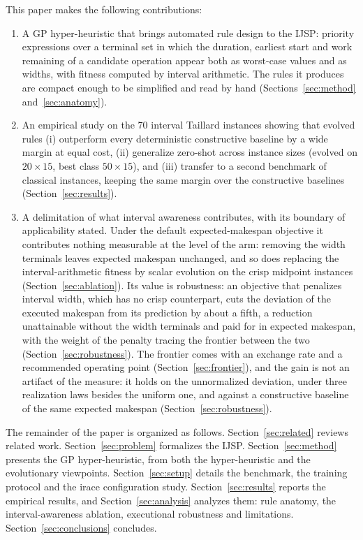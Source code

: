 \documentclass[review,authoryear,11pt]{elsarticle}
\newcommand{\rev}[1]{\textcolor{revcolor}{#1}}
\begin{document}
This paper makes the following contributions:
\begin{enumerate}
\item A GP hyper-heuristic that brings automated rule design to the
  IJSP: priority expressions over a terminal set in which the duration,
  earliest start and work remaining of a candidate operation appear
  both as worst-case values and as widths, with fitness computed by
  interval arithmetic. The rules it produces are compact enough to be
  simplified and read by hand (Sections~\ref{sec:method}
  and~\ref{sec:anatomy}).
\item An empirical study on the 70 interval Taillard instances showing
  that evolved rules (i) outperform every deterministic constructive
  baseline by a wide margin at equal cost, (ii) generalize zero-shot across instance
  sizes (evolved on $20{\times}15$, best class $50{\times}15$), and
  (iii) transfer to a second benchmark of classical instances, keeping
  the same margin over the constructive baselines
  (Section~\ref{sec:results}).
\item A delimitation of what interval awareness contributes, \rev{with
  its boundary of applicability stated}. \rev{Under the default
  expected-makespan objective it contributes nothing measurable at the
  level of the arm}: removing the width terminals leaves expected
  makespan unchanged, and so does replacing the interval-arithmetic
  fitness by scalar evolution on the crisp midpoint instances
  (Section~\ref{sec:ablation}). Its value is robustness: an
  objective that penalizes interval width, which has no crisp
  counterpart, cuts the deviation of the executed makespan from its
  prediction by about a fifth, a reduction unattainable without the
  width terminals and paid for in expected makespan, with the weight of
  the penalty tracing the frontier between the two
  (Section~\ref{sec:robustness}). \rev{The frontier comes with an
  exchange rate and a recommended operating point
  (Section~\ref{sec:frontier}), and the gain is not an artifact of the
  measure: it holds on the unnormalized deviation, under three
  realization laws besides the uniform one, and against a constructive
  baseline of the same expected makespan
  (Section~\ref{sec:robustness}).}
\end{enumerate}

The remainder of the paper is organized as follows.
Section~\ref{sec:related} reviews related work.
Section~\ref{sec:problem} formalizes the IJSP.
Section~\ref{sec:method} presents the GP hyper-heuristic, from both the
hyper-heuristic and the evolutionary viewpoints.
Section~\ref{sec:setup} details the benchmark, the training protocol and
the irace configuration study. Section~\ref{sec:results} reports the
empirical results, and Section~\ref{sec:analysis} analyzes them: rule
anatomy, the interval-awareness ablation, executional robustness and
limitations.
Section~\ref{sec:conclusions} concludes.
\end{document}
